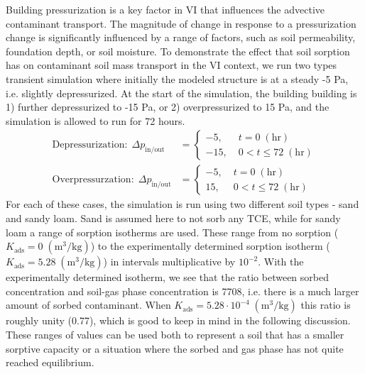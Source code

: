 Building pressurization is a key factor in VI that influences the advective contaminant transport.
The magnitude of change in response to a pressurization change is significantly influenced by a range of factors, such as soil permeability, foundation depth, or soil moisture.
To demonstrate the effect that soil sorption has on contaminant soil mass transport in the VI context, we run two types transient simulation where initially the modeled structure is at a steady -5 Pa, i.e. slightly depressurized.
At the start of the simulation, the building building is 1) further depressurized to -15 Pa, or 2) overpressurized to 15 Pa, and the simulation is allowed to run for 72 hours.
\begin{align}
  \text{Depressurization}: \; \Delta p_\mathrm{in/out} &= \begin{cases}
    -5, \; &t = 0 \; \mathrm{(hr)} \\
    -15, \; &0 < t \leq 72 \; \mathrm{(hr)}
\end{cases}\label{eq:equilibrium_depressurization}\\
\text{Overpressurzation}: \; \Delta p_\mathrm{in/out} &= \begin{cases}
  -5, \; &t = 0 \; \mathrm{(hr)} \\
  15, \; &0 < t \leq 72 \; \mathrm{(hr)}
\end{cases}\label{eq:equilibrium_overpressurization}
\end{align}
For each of these cases, the simulation is run using two different soil types - sand and sandy loam.
Sand is assumed here to not sorb any TCE, while for sandy loam a range of sorption isotherms are used.
These range from no sorption ($K_\mathrm{ads} = 0 \; \mathrm{(m^3/kg)}$) to the experimentally determined sorption isotherm ($K_\mathrm{ads} = 5.28 \; \mathrm{(m^3/kg)}$) in intervals multiplicative by $10^{-2}$. With the experimentally determined isotherm, we see that the ratio between sorbed concentration and soil-gas phase concentration is 7708, i.e. there is a much larger amount of sorbed contaminant.
When $K_\mathrm{ads} = 5.28 \cdot 10^{-4} \; \mathrm{(m^3/kg)}$ this ratio is roughly unity (0.77), which is good to keep in mind in the following discussion. %
These ranges of values can be used both to represent a soil that has a smaller sorptive capacity or a situation where the sorbed and gas phase has not quite reached equilibrium.\par

